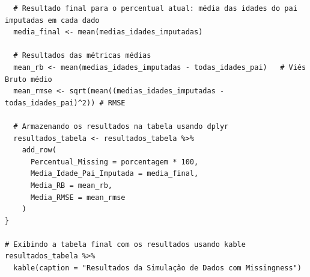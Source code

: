 \documentclass[11pt]{article}
\begin{document}
\begin{verbatim}
  # Resultado final para o percentual atual: média das idades do pai imputadas em cada dado
  media_final <- mean(medias_idades_imputadas)
  
  # Resultados das métricas médias
  mean_rb <- mean(medias_idades_imputadas - todas_idades_pai)   # Viés Bruto médio
  mean_rmse <- sqrt(mean((medias_idades_imputadas - todas_idades_pai)^2)) # RMSE

  # Armazenando os resultados na tabela usando dplyr
  resultados_tabela <- resultados_tabela %>%
    add_row(
      Percentual_Missing = porcentagem * 100,
      Media_Idade_Pai_Imputada = media_final,
      Media_RB = mean_rb,
      Media_RMSE = mean_rmse
    )
}

# Exibindo a tabela final com os resultados usando kable
resultados_tabela %>%
  kable(caption = "Resultados da Simulação de Dados com Missingness")

\end{verbatim}
\end{document}
